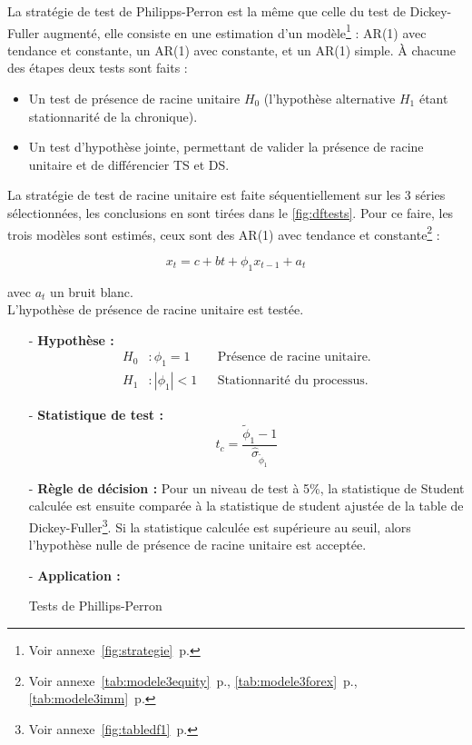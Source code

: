 La stratégie de test de Philipps-Perron est la même que celle du test de Dickey-Fuller augmenté, elle consiste en une estimation d'un modèle\footnote{Voir annexe~\autoref{fig:strategie}~p.\pageref{fig:strategie}} : AR(1) 
avec tendance et constante, un AR(1) avec constante, et un AR(1) simple. À chacune des étapes deux tests sont faits :

\begin{itemize}
    \item Un test de présence de racine unitaire $H_{0}$ (l'hypothèse alternative $H_{1}$ étant stationnarité de la chronique).
    \item Un test d'hypothèse jointe, permettant de valider la présence de racine unitaire et de différencier TS et DS. 
\end{itemize}

La stratégie de test de racine unitaire est faite séquentiellement sur les 3 séries sélectionnées, les conclusions en sont tirées dans le \autoref{fig:dftests}. Pour ce faire, les trois modèles sont estimés, ceux sont des AR(1) avec tendance et constante\footnote{Voir annexe~\autoref{tab:modele3equity}~p.\pageref{tab:modele3equity}, \autoref{tab:modele3forex}~p.\pageref{tab:modele3forex},
\autoref{tab:modele3imm}~p.\pageref{tab:modele3imm}} :

\begin{equation*}
    x_{t} = c + bt + \phi_{1} x_{t-1} + a_{t}
\end{equation*}

avec $a_t$ un bruit blanc.\\

L'hypothèse de présence de racine unitaire est testée.
%
\begin{itemize}
\item[-]\textbf{ Hypothèse :} 
\begin{align*}
    H_{0} &: \phi_{1} = 1  & &\text{Présence de racine unitaire.}\\
    H_{1} &:|\phi_{1}| < 1   &  &\text{Stationnarité du processus.}
\end{align*}
\item[-]\textbf{Statistique de test :} 
\begin{equation*}
    t_{c} = \frac{\tilde{\phi}_{1}- 1}{\hat{\sigma}_{\tilde{\phi}_{1}}}
\end{equation*}
\item[-]\textbf{Règle de décision :} Pour un niveau de test à 5\%, la statistique de Student calculée est ensuite comparée à la statistique de student ajustée de la table de Dickey-Fuller\footnote{Voir annexe~\autoref{fig:tabledf1}~p.\pageref{fig:tabledf1}}. Si la statistique calculée est supérieure au seuil, alors l'hypothèse nulle de présence de racine unitaire est acceptée.
\item[-]\textbf{Application :} 
\begin{table}[H]
    \centering
    \caption{Tests de Phillips-Perron}
    \sffamily
    
    \label{fig:dftests}
\end{table}

\end{itemize}

